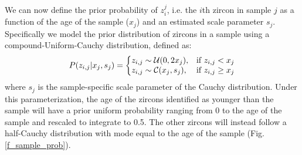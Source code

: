 \documentclass[12pt,letterpaper]{article}
\begin{document}
We can now define the prior probability of $z_i^j$, i.e. the $i$th zircon in sample $j$ as a function of the age of the sample ($x_j$) and an estimated scale parameter $s_j$. 
Specifically we model the prior distribution of zircons in a sample using a compound-Uniform-Cauchy distribution, defined as:
\begin{equation}
P(z_{i,j} | x_j, s_j) = \left\{
\begin{array}{@{}ll@{}}
    z_{i,j} \sim \mathcal{U}(0, 2x_j), & \text{if}\      z_{i,j} < x_j \\
    z_{i,j} \sim \mathcal{C}(x_j, s_j), & \text{if}\      z_{i,j} \geq x_j \\
\end{array}\right.
\end{equation}
where $s_j$ is the sample-specific scale parameter of the Cauchy distribution. 
Under this parameterization, the age of the zircons identified as younger than the sample will have a prior uniform probability ranging from 0 to the age of the sample and rescaled to integrate to 0.5.
The other zircons will instead follow a half-Cauchy distribution with mode equal to the age of the sample (Fig. \ref{f_sample_prob}). 
\end{document}
